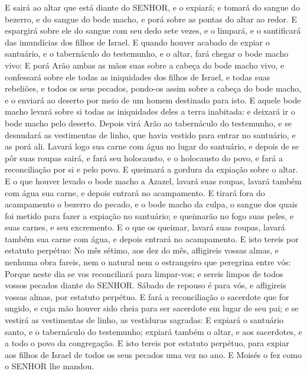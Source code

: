 {{  E sairá ao altar que está diante do SENHOR, e o expiará; e tomará do sangue do bezerro, e do sangue do bode macho, e porá sobre as pontas do altar ao redor.
  E espargirá sobre ele do sangue com seu dedo sete vezes, e o limpará, e o santificará das imundícias dos filhos de Israel.
  E quando houver acabado de expiar o santuário, e o tabernáculo do testemunho, e o altar, fará chegar o bode macho vivo:
  E porá Arão ambas as mãos suas sobre a cabeça do bode macho vivo, e confessará sobre ele todas as iniquidades dos filhos de Israel, e todas suas rebeliões, e todos os seus pecados, pondo-os assim sobre a cabeça do bode macho, e o enviará ao deserto por meio de um homem destinado para isto.
  E aquele bode macho levará sobre si todas as iniquidades deles a terra inabitada: e deixará ir o bode macho pelo deserto.
  Depois virá Arão ao tabernáculo do testemunho, e se desnudará as vestimentas de linho, que havia vestido para entrar no santuário, e as porá ali.
  Lavará logo sua carne com água no lugar do santuário, e depois de se pôr suas roupas sairá, e fará seu holocausto, e o holocausto do povo, e fará a reconciliação por si e pelo povo.
  E queimará a gordura da expiação sobre o altar.
  E o que houver levado o bode macho a Azazel, lavará suas roupas, lavará também com água sua carne, e depois entrará no acampamento.
  E tirará fora do acampamento o bezerro do pecado, e o bode macho da culpa, o sangue dos quais foi metido para fazer a expiação no santuário; e queimarão no fogo suas peles, e suas carnes, e seu excremento.
  E o que os queimar, lavará suas roupas, lavará também sua carne com água, e depois entrará no acampamento.
  E isto tereis por estatuto perpétuo: No mês sétimo, aos dez do mês, afligireis vossas almas, e nenhuma obra fareis, nem o natural nem o estrangeiro que peregrina entre vós:
  Porque neste dia se vos reconciliará para limpar-vos; e sereis limpos de todos vossos pecados diante do SENHOR.
  Sábado de repouso é para vós, e afligireis vossas almas, por estatuto perpétuo.
  E fará a reconciliação o sacerdote que for ungido, e cuja mão houver sido cheia para ser sacerdote em lugar de seu pai; e se vestirá as vestimentas de linho, as vestiduras sagradas:
  E expiará o santuário santo, e o tabernáculo do testemunho; expiará também o altar, e aos sacerdotes, e a todo o povo da congregação.
  E isto tereis por estatuto perpétuo, para expiar aos filhos de Israel de todos os seus pecados uma vez no ano}. E Moisés o fez como o SENHOR lhe mandou.
\par }

